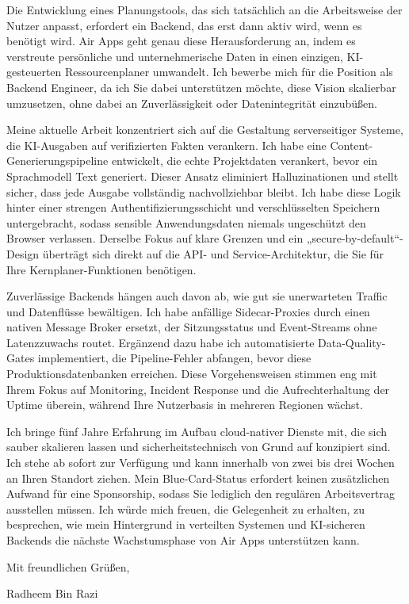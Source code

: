 \documentclass[11pt,a4paper]{coverletter}
\begin{document}
Die Entwicklung eines Planungstools, das sich tatsächlich an die Arbeitsweise der Nutzer anpasst, erfordert ein Backend, das erst dann aktiv wird, wenn es benötigt wird. Air Apps geht genau diese Herausforderung an, indem es verstreute persönliche und unternehmerische Daten in einen einzigen, KI-gesteuerten Ressourcenplaner umwandelt. Ich bewerbe mich für die Position als Backend Engineer, da ich Sie dabei unterstützen möchte, diese Vision skalierbar umzusetzen, ohne dabei an Zuverlässigkeit oder Datenintegrität einzubüßen.

Meine aktuelle Arbeit konzentriert sich auf die Gestaltung serverseitiger Systeme, die KI-Ausgaben auf verifizierten Fakten verankern. Ich habe eine Content-Generierungspipeline entwickelt, die echte Projektdaten verankert, bevor ein Sprachmodell Text generiert. Dieser Ansatz eliminiert Halluzinationen und stellt sicher, dass jede Ausgabe vollständig nachvollziehbar bleibt. Ich habe diese Logik hinter einer strengen Authentifizierungsschicht und verschlüsselten Speichern untergebracht, sodass sensible Anwendungsdaten niemals ungeschützt den Browser verlassen. Derselbe Fokus auf klare Grenzen und ein „secure-by-default“-Design überträgt sich direkt auf die API- und Service-Architektur, die Sie für Ihre Kernplaner-Funktionen benötigen.

Zuverlässige Backends hängen auch davon ab, wie gut sie unerwarteten Traffic und Datenflüsse bewältigen. Ich habe anfällige Sidecar-Proxies durch einen nativen Message Broker ersetzt, der Sitzungsstatus und Event-Streams ohne Latenzzuwachs routet. Ergänzend dazu habe ich automatisierte Data-Quality-Gates implementiert, die Pipeline-Fehler abfangen, bevor diese Produktionsdatenbanken erreichen. Diese Vorgehensweisen stimmen eng mit Ihrem Fokus auf Monitoring, Incident Response und die Aufrechterhaltung der Uptime überein, während Ihre Nutzerbasis in mehreren Regionen wächst.

Ich bringe fünf Jahre Erfahrung im Aufbau cloud-nativer Dienste mit, die sich sauber skalieren lassen und sicherheitstechnisch von Grund auf konzipiert sind. Ich stehe ab sofort zur Verfügung und kann innerhalb von zwei bis drei Wochen an Ihren Standort ziehen. Mein Blue-Card-Status erfordert keinen zusätzlichen Aufwand für eine Sponsorship, sodass Sie lediglich den regulären Arbeitsvertrag ausstellen müssen. Ich würde mich freuen, die Gelegenheit zu erhalten, zu besprechen, wie mein Hintergrund in verteilten Systemen und KI-sicheren Backends die nächste Wachstumsphase von Air Apps unterstützen kann.

\closing{Mit freundlichen Grüßen,}{Radheem Bin Razi}
\end{document}
